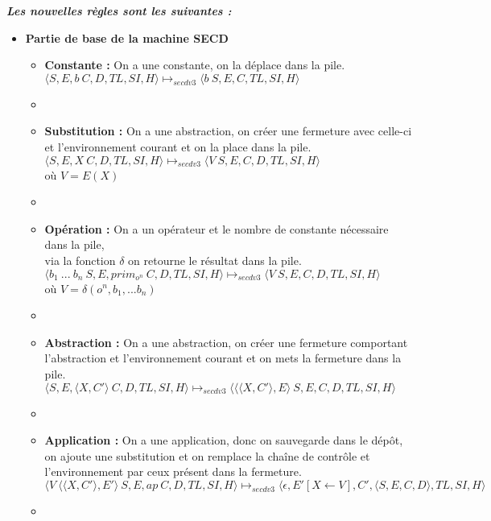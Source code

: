 \documentclass[10pt,a4paper]{article}
\begin{document}
				\textbf{\textit{Les nouvelles règles sont les suivantes :}}
				\smallbreak
				\begin{itemize}
					\item[] \textbf{Partie de base de la machine SECD}
					\begin{itemize}
						\item[] \textbf{Constante :} On a une constante, on la déplace dans la pile.
						\smallbreak
						$\langle S,E,b~C,D,TL,SI,H\rangle \longmapsto_{secdv3} \langle b~S,E,C,TL,SI,H\rangle$
						\item[]
						
						\item[] \textbf{Substitution :} On a une abstraction, on créer une fermeture avec celle-ci et l'environnement courant et on la place dans la pile.
						\smallbreak
						$\langle S,E,X~C,D,TL,SI,H\rangle \longmapsto_{secdv3} \langle V~S,E,C,D,TL,SI,H\rangle$
						\\où $V = E(X)$
						\item[]
						
						\item[] \textbf{Opération :} On a un opérateur et le nombre de constante nécessaire dans la pile, \\via la fonction $\delta$ on retourne le résultat dans la pile.
						\smallbreak
						$\langle b_{1}~...~b_{n}~S,E,prim_{o^{n}}~C,D,TL,SI,H\rangle \longmapsto_{secdv3} \langle V~S,E,C,D,TL,SI,H\rangle$ 
						\\où $V = \delta(o^{n},b_1,...b_{n})$
						\item[]
						
						\item[]  \textbf{Abstraction :} On a une abstraction, on créer une fermeture comportant l'abstraction et l'environnement courant et on mets la fermeture dans la pile.
						\smallbreak 
						$\langle S,E,\langle X,C'\rangle~C,D,TL,SI,H\rangle \longmapsto_{secdv3} \langle\langle\langle X,C'\rangle,E\rangle~S,E,C,D,TL,SI,H\rangle$
						\item[]
						
						\item[]  \textbf{Application :} On a une application, donc on sauvegarde dans le dépôt, on ajoute une substitution et on remplace la chaîne de contrôle et l'environnement par ceux présent dans la fermeture.
						\smallbreak
						$\langle V~\langle\langle X,C'\rangle,E'\rangle~S,E,ap~C,D,TL,SI,H\rangle \longmapsto_{secdv3} \langle\epsilon,E'[X \leftarrow V],C',\langle S,E,C,D\rangle,TL,SI,H\rangle$
						\item[]
						

\end{itemize}
\end{itemize}
\end{document}
